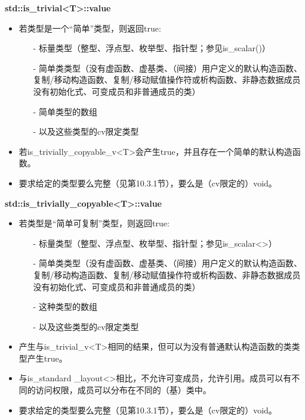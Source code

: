 \textbf{std::is\_trivial<T>::value}

\begin{itemize}
\item 
若类型是一个“简单”类型，则返回true:

\begin{itemize}
\item [-]
标量类型（整型、浮点型、枚举型、指针型；参见is\_scalar()）

\item [-]
简单类类型（没有虚函数、虚基类、（间接）用户定义的默认构造函数、复制/移动构造函数、复制/移动赋值操作符或析构函数、非静态数据成员没有初始化式、可变成员和非普通成员的类）

\item [-]
简单类型的数组

\item [-]
以及这些类型的cv限定类型
\end{itemize}

\item 
若is\_trivially\_copyable\_v<T>会产生true，并且存在一个简单的默认构造函数。

\item 
要求给定的类型要么完整（见第10.3.1节），要么是（cv限定的）void。
\end{itemize}

\textbf{std::is\_trivially\_copyable<T>::value}

\begin{itemize}
\item 
若类型是“简单可复制”类型，则返回true:

\begin{itemize}
\item [-]
标量类型（整型、浮点型、枚举型、指针型；参见is\_scalar<>）

\item [-]
简单类类型（没有虚函数、虚基类、（间接）用户定义的默认构造函数、复制/移动构造函数、复制/移动赋值操作符或析构函数、非静态数据成员没有初始化式、可变成员和非普通成员的类）

\item [-]
这种类型的数组

\item [-]
以及这些类型的cv限定类型
\end{itemize}

\item 
产生与is\_trivial\_v<T>相同的结果，但可以为没有普通默认构造函数的类类型产生true。

\item 
与is\_standard \_layout<>相比，不允许可变成员，允许引用。成员可以有不同的访问权限，成员可以分布在不同的（基）类中。

\item 
要求给定的类型要么完整（见第10.3.1节），要么是（cv限定的）void。
\end{itemize}

